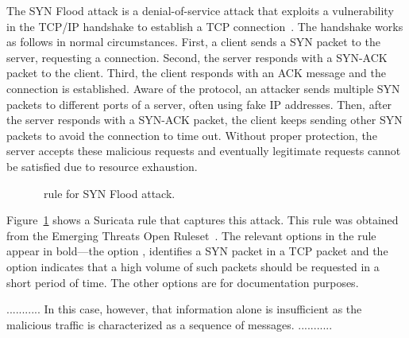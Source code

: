 \documentclass[sigconf,review, anonymous]{acmart}
\begin{document}

The SYN Flood attack is a denial-of-service attack that exploits a vulnerability in the TCP/IP handshake
to establish a TCP connection~\cite{cloudfare-synflood}. The handshake
works as follows in normal circumstances. First, a client sends a SYN
packet to the server, requesting a connection. Second, the server
responds with a SYN-ACK packet to the client. Third, the client
responds with an ACK message and the connection is established. Aware
of the protocol, an attacker sends multiple SYN packets to different
ports of a server, often using fake IP addresses. Then, after the
server responds with a SYN-ACK packet, the client keeps sending other
SYN packets to avoid the connection to time out. Without proper
protection, the server accepts these malicious requests and eventually
legitimate requests cannot be satisfied due to resource exhaustion.

\vspace{-1ex}
\begin{figure}[h!]
  
  \vspace{-2ex}
  \caption{\suri\ rule for SYN Flood attack.}
  \label{fig:synflood-example}
\end{figure}
\vspace{-2ex}

Figure~\ref{fig:synflood-example} shows a Suricata rule that captures
this attack. This rule was obtained from the Emerging Threats Open
Ruleset~\cite{emerging-threats-open}. The relevant options in the
rule appear in bold---the option , identifies a
SYN packet in a TCP packet and the option  indicates that a high
volume of such packets should be requested in a short period of
time. The other options are for documentation purposes.


...........
In this case, however, that information alone is
insufficient as the malicious traffic is characterized as a sequence
of messages. 
...........


\end{document}
